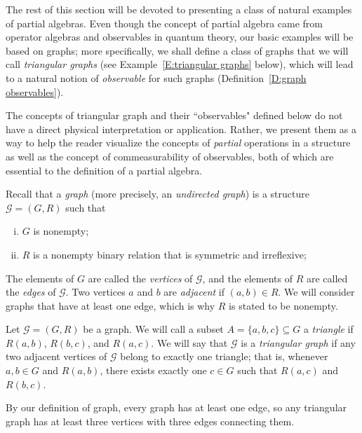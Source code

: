 \documentclass{scrartcl}
\newcommand{\SG}{\mathscr{G}}
\begin{document}
The rest of this section will be devoted to presenting a class of natural examples of partial algebras. Even though the concept of partial algebra came from operator algebras and observables in quantum theory, our basic examples will be based on graphs; more specifically, we shall define a class of graphs that we will call \emph{triangular graphs} (see Example~\ref{E:triangular graphs} below), which will lead to a natural notion of \emph{observable} for such graphs (Definition~\ref{D:graph observables}).

\begin{remark}
The concepts of triangular graph and their ``observables" defined below do not have a direct physical interpretation or application. Rather, we present them as a way to help the reader visualize the concepts of \emph{partial} operations in a structure as well as the concept of commeasurability of observables, both of which are essential to the definition of a partial algebra.
\end{remark}



Recall that a \emph{graph} (more precisely, an \emph{undirected graph}) is a structure $\SG=(G, R)$ such that
\begin{enumerate}[i)]

\item
$G$ is nonempty;

\item
$R$ is a nonempty binary relation that is symmetric and irreflexive;

\end{enumerate}

The elements of $G$ are called the \emph{vertices} of $\SG$, and the elements of $R$ are called the \emph{edges} of $\SG$. Two vertices $a$ and $b$ are \emph{adjacent} if $(a,b)\in R$. We will consider graphs that have at least one edge, which is why $R$ is stated to be nonempty.



\begin{definition}
Let $\SG=(G,R)$ be a graph. We will call a subset $A = \{a,b,c\}\subseteq G$ a \emph{triangle} if $R(a,b)$, $R(b,c)$, and $R(a,c)$.
We will say that $\SG$ is a \emph{triangular graph} 
if any two adjacent vertices of $\SG$ belong to exactly one triangle; that is, whenever $a, b\in G$ and $R(a,b)$, there exists exactly one $c\in G$ such that $R(a,c)$ and $R(b,c)$.
\end{definition}

By our definition of graph, every graph has at least one edge, so any triangular graph has at least three vertices with three edges connecting them.
\end{document}
